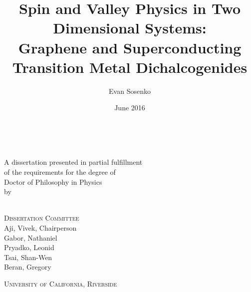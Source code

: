 \title{Spin and Valley Physics in Two Dimensional Systems: \\%
  Graphene and Superconducting Transition Metal Dichalcogenides}
\author{Evan Sosenko}
\date{June 2016}

\newcommand{\thedegree}{Doctor of Philosophy}
\newcommand{\thefield}{Physics}
\newcommand{\theuniversity}{University of California, Riverside}
\newcommand{\thechair}{Aji, Vivek}
\newcommand{\thecommittee}{%
  Gabor, Nathaniel \\
  Pryadko, Leonid \\
  Tsai, Shan-Wen \\
  Beran, Gregory
}

\clearpage
\thispagestyle{empty}
\centering
\vspace*{-\toptafiddle}

\textsc{\thetitle} \\

\vfill

A dissertation presented in partial fulfillment \\
of the requirements for the degree of \\
\thedegree{} in \thefield{} \\
by \\
\theauthor{} \\
\thedate{}

\vfill

\textsc{Dissertation Committee} \\
\thechair{}, Chairperson \\
\thecommittee{}

\vfill

\textsc{\theuniversity}

\enlargethispage{\bottafiddle}
\clearpage
